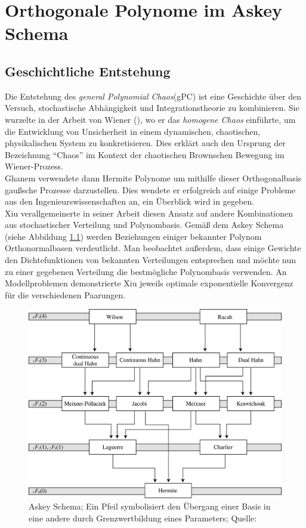 
\chapter{Orthogonale Polynome im Askey Schema} %

\label{AppendixA} %

\section{Geschichtliche Entstehung}
Die Entstehung des \emph{general Polynomial Chaos}(gPC) ist eine Geschichte über den Versuch, stochastische Abhängigkeit und Integrationstheorie zu kombinieren. Sie wurzelte in der Arbeit von Wiener (\autocite{norbertwiener1938}), wo er das \emph{homogene Chaos} einführte, um die Entwicklung von Unsicherheit in einem dynamischen, chaotischen, physikalischen System zu konkretisieren. Dies erklärt auch den Ursprung der Bezeichnung "`Chaos"' im Kontext der chaotischen Brownschen Bewegung im Wiener-Prozess.\\
Ghanem verwendete dann Hermite Polynome um mithilfe dieser Orthogonalbasis gaußsche Prozesse darzustellen. Dies wendete er erfolgreich auf einige Probleme aus den Ingenieurswissenschaften an, ein Überblick wird in \autocite{GhaSpa91} gegeben.\\
Xiu verallgemeinerte in seiner Arbeit \autocite{xiu2002} diesen Ansatz auf andere Kombinationen aus stochastischer Verteilung und Polynombasis. Gemäß dem Askey Schema (siehe Abbildung \ref{askeyscheme}) werden Beziehungen einiger bekannter Polynom Orthonormalbasen verdeutlicht. Man beobachtet außerdem, dass einige Gewichte den Dichtefunktionen von bekannten Verteilungen entsprechen und möchte nun zu einer gegebenen Verteilung die bestmögliche Polynombasis verwenden. An Modellproblemen demonstrierte Xiu jeweils optimale exponentielle Konvergenz für die verschiedenen Paarungen.\\
\begin{figure}
\center
\includegraphics[width=0.8\linewidth]{Figures/askeyscheme.png}
\caption{Askey Schema; Ein Pfeil symbolisiert den Übergang einer Basis in eine andere durch Grenzwertbildung eines Parameters; Quelle: \autocite{webaskey}}
\label{askeyscheme}
\end{figure}
